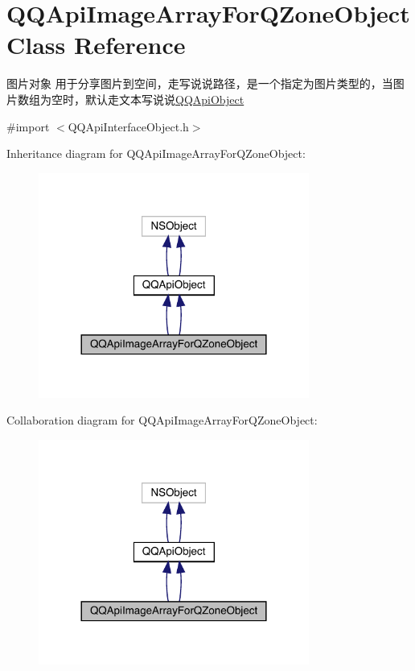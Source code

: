\hypertarget{interface_q_q_api_image_array_for_q_zone_object}{}\section{Q\+Q\+Api\+Image\+Array\+For\+Q\+Zone\+Object Class Reference}
\label{interface_q_q_api_image_array_for_q_zone_object}


图片对象 用于分享图片到空间，走写说说路径，是一个指定为图片类型的，当图片数组为空时，默认走文本写说说{\ttfamily \mbox{\hyperlink{interface_q_q_api_object}{Q\+Q\+Api\+Object}}}  




{\ttfamily \#import $<$Q\+Q\+Api\+Interface\+Object.\+h$>$}



Inheritance diagram for Q\+Q\+Api\+Image\+Array\+For\+Q\+Zone\+Object\+:\nopagebreak
\begin{figure}[H]
\begin{center}
\leavevmode
\includegraphics[width=252pt]{interface_q_q_api_image_array_for_q_zone_object__inherit__graph}
\end{center}
\end{figure}


Collaboration diagram for Q\+Q\+Api\+Image\+Array\+For\+Q\+Zone\+Object\+:\nopagebreak
\begin{figure}[H]
\begin{center}
\leavevmode
\includegraphics[width=252pt]{interface_q_q_api_image_array_for_q_zone_object__coll__graph}
\end{center}
\end{figure}
